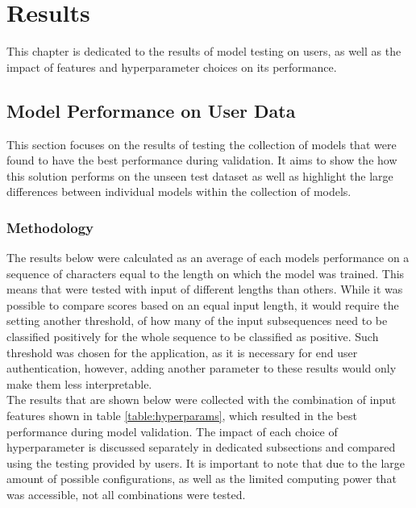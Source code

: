 \chapter{Results}
This chapter is dedicated to the results of model testing on users, as well as the impact of features and hyperparameter choices on its performance. 

\section{Model Performance on User Data}
This section focuses on the results of testing the collection of models that were found to have the best performance during validation. It aims to show the how this solution performs on the unseen test dataset as well as highlight the large differences between individual models within the collection of models.

\subsection{Methodology}
The results below were calculated as an average of each models performance on a sequence of characters equal to the length on which the model was trained.
This means that were tested with input of different lengths than others. 
While it was possible to compare scores based on an equal input length,
it would require the setting another threshold, of how many of the input subsequences need to be classified positively for the whole sequence to be classified as positive. 
Such threshold was chosen for the application, as it is necessary for end user authentication, however, adding another parameter to these results would only make them less interpretable.\\
The results that are shown below were collected with the combination of input features shown in table \ref{table:hyperparams}, which resulted in the best performance during model validation. The impact of each choice of hyperparameter is discussed separately in dedicated subsections and compared using the testing provided by users. It is important to note that due to the large amount of possible configurations, as well as the limited computing power that was accessible, not all combinations were tested.

